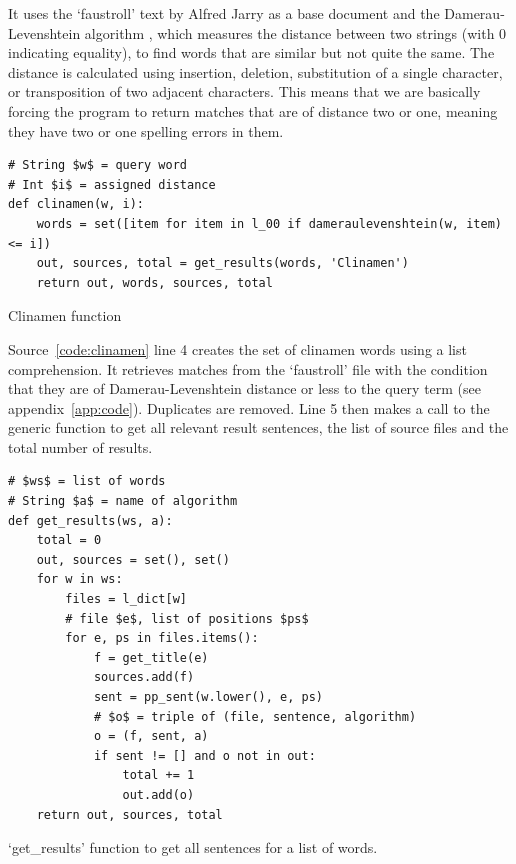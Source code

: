 
It uses the `faustroll' text by Alfred Jarry \citeyear{Jarry1996} as a base document and the Damerau-Levenshtein algorithm \parencite{Damerau1964, Levenshtein1966}, which measures the distance between two strings (with 0 indicating equality), to find words that are similar but not quite the same. The distance is calculated using insertion, deletion, substitution of a single character, or transposition of two adjacent characters. This means that we are basically forcing the program to return matches that are of distance two or one, meaning they have two or one spelling errors in them.

\begin{listing}
  \begin{verbatim}
# String $w$ = query word
# Int $i$ = assigned distance
def clinamen(w, i):
    words = set([item for item in l_00 if dameraulevenshtein(w, item) <= i])
    out, sources, total = get_results(words, 'Clinamen')
    return out, words, sources, total
  \end{verbatim}
\caption{Clinamen function}
\label{code:clinamen}
\end{listing}

Source~\ref{code:clinamen} line 4 creates the set of clinamen words using a list comprehension. It retrieves matches from the `faustroll' file  with the condition that they are of Damerau-Levenshtein distance  or less to the query term  (see appendix~\ref{app:code}). Duplicates are removed. Line 5 then makes a call to the generic  function to get all relevant result sentences, the list of source files and the total number of results.

\begin{listing}
  \begin{verbatim}
# $ws$ = list of words
# String $a$ = name of algorithm
def get_results(ws, a):
    total = 0
    out, sources = set(), set()
    for w in ws:
        files = l_dict[w]
        # file $e$, list of positions $ps$
        for e, ps in files.items():
            f = get_title(e)
            sources.add(f)
            sent = pp_sent(w.lower(), e, ps)
            # $o$ = triple of (file, sentence, algorithm)
            o = (f, sent, a)
            if sent != [] and o not in out:
                total += 1
                out.add(o)
    return out, sources, total
  \end{verbatim}
\caption{`get\_results' function to get all sentences for a list of words.}
\label{code:getresults}
\end{listing}

